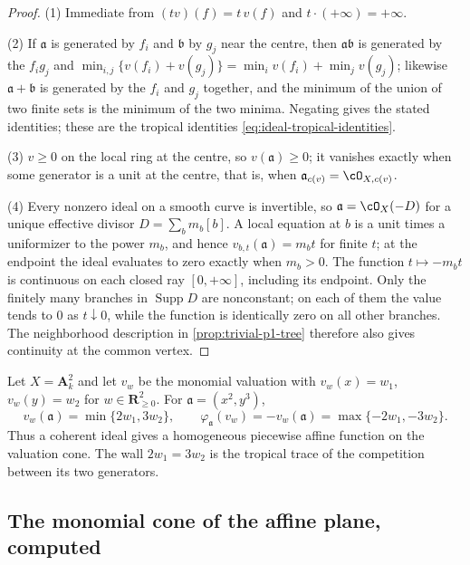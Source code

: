\begin{proof}
(1)  Immediate from $(tv)(f)=t\,v(f)$ and $t\cdot(+\infty)=+\infty$.

(2)  If $\mathfrak a$ is generated by $f_i$ and $\mathfrak b$ by $g_j$ near
the centre, then $\mathfrak a\mathfrak b$ is generated by the $f_ig_j$ and
$\min_{i,j}\{v(f_i)+v(g_j)\}=\min_iv(f_i)+\min_jv(g_j)$; likewise
$\mathfrak a+\mathfrak b$ is generated by the $f_i$ and $g_j$ together, and
the minimum of the union of two finite sets is the minimum of the two
minima.  Negating gives the stated identities; these are the tropical
identities \eqref{eq:ideal-tropical-identities}.

(3)  $v\geq0$ on the local ring at the centre, so $v(\mathfrak a)\geq0$;
it vanishes exactly when some generator is a unit at the centre, that is,
when $\mathfrak a_{c(v)}=\cO_{X,c(v)}$.

(4)  Every nonzero ideal on a smooth curve is invertible, so
$\mathfrak a=\cO_X(-D)$ for a unique effective divisor
$D=\sum_bm_b[b]$.  A local equation at $b$ is a unit times a uniformizer to
the power $m_b$, and hence
$v_{b,t}(\mathfrak a)=m_bt$ for finite $t$; at the endpoint the ideal
evaluates to zero exactly when $m_b>0$.  The
function $t\mapsto-m_bt$ is continuous on each closed ray
$[0,+\infty]$, including its endpoint.  Only the finitely many branches in
$\operatorname{Supp}D$ are nonconstant; on each of them the value tends to
$0$ as $t\downarrow0$, while the function is identically zero on all other
branches.  The neighborhood description in
\cref{prop:trivial-p1-tree} therefore also gives continuity at the common
vertex.
\end{proof}

\begin{example}
\label{ex:ch08-monomial-ideal}
Let $X=\mathbf A^2_k$ and let $v_w$ be the monomial valuation with
$v_w(x)=w_1$, $v_w(y)=w_2$ for $w\in\mathbf R_{\geq0}^2$.  For
$\mathfrak a=(x^2,y^3)$,
\[
 v_w(\mathfrak a)=\min\{2w_1,3w_2\},
 \qquad
 \varphi_{\mathfrak a}(v_w)=-v_w(\mathfrak a)
 =\max\{-2w_1,-3w_2\}.
\]
Thus a coherent ideal gives a homogeneous piecewise affine function on the
valuation cone.  The wall $2w_1=3w_2$ is the tropical trace of the competition
between its two generators.
\end{example}

\subsection{The monomial cone of the affine plane, computed}
\label{sec:ch08-monomial-cone}

